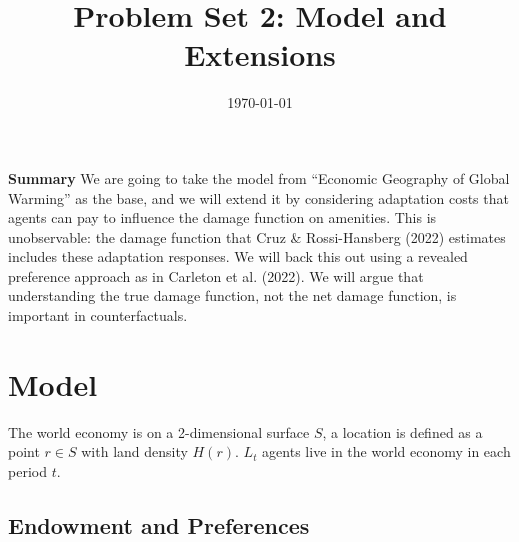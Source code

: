 \documentclass[12pt]{amsart}
\title{Problem Set 2: Model and Extensions}
\author{}
\date{\today}
\begin{document}
\maketitle

\textbf{Summary} We are going to take the model from ``Economic Geography of Global Warming'' as the base, and we will extend it by considering adaptation costs that agents can pay to influence the damage function on amenities. This is unobservable: the damage function that Cruz \& Rossi-Hansberg (2022) estimates includes these adaptation responses. We will back this out using a revealed preference approach as in Carleton et al. (2022). We will argue that understanding the true damage function, not the net damage function, is important in counterfactuals.

\section{Model}

The world economy is on a 2-dimensional surface $S$, a location is defined as a point $r \in S$ with land density $H(r)$. $L_t$ agents live in the world economy in each period $t$.

\subsection{Endowment and Preferences}
\end{document}

